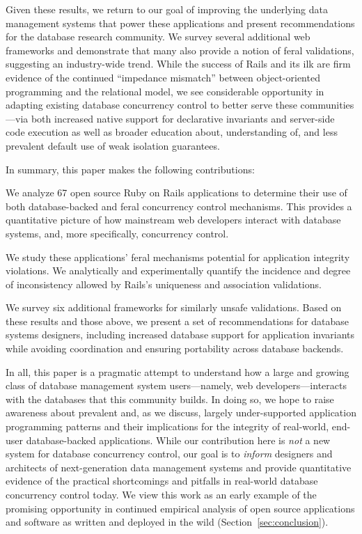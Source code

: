 Given these results, we return to our goal of improving the underlying
data management systems that power these applications and present
recommendations for the database research community. We survey several
additional web frameworks and demonstrate that many also provide a
notion of feral validations, suggesting an industry-wide trend. While
the success of Rails and its ilk are firm evidence of the continued
``impedance mismatch'' between object-oriented programming and the
relational model, we see considerable opportunity in adapting existing
database concurrency control to better serve these communities---via
both increased native support for declarative invariants and
server-side code execution as well as broader education about,
understanding of, and less prevalent default use of weak isolation
guarantees.

In summary, this paper makes the following contributions:
\begin{myitemize}
\item We analyze 67 open source Ruby on Rails applications to
  determine their use of both database-backed and feral concurrency
  control mechanisms. This provides a quantitative picture of how
  mainstream web developers interact with database systems, and, more
  specifically, concurrency control.

\item We study these applications' feral mechanisms potential for
  application integrity violations. We analytically and experimentally
  quantify the incidence and degree of inconsistency allowed by
  Rails's uniqueness and association validations.

\item We survey six additional frameworks for similarly unsafe
  validations. Based on these results and those above, we present a
  set of recommendations for database systems designers, including
  increased database support for application invariants while avoiding
  coordination and ensuring portability across database backends.
\end{myitemize}

In all, this paper is a pragmatic attempt to understand how a large
and growing class of database management system users---namely, web
developers---interacts with the databases that this community
builds. In doing so, we hope to raise awareness about prevalent and,
as we discuss, largely under-supported application programming
patterns and their implications for the integrity of real-world,
end-user database-backed applications. While our contribution here is
\textit{not} a new system for database concurrency control, our goal
is to \textit{inform} designers and architects of next-generation data
management systems and provide quantitative evidence of the practical
shortcomings and pitfalls in real-world database concurrency control
today. We view this work as an early example of the promising
opportunity in continued empirical analysis of open source
applications and software as written and deployed in the wild
(Section~\ref{sec:conclusion}).


